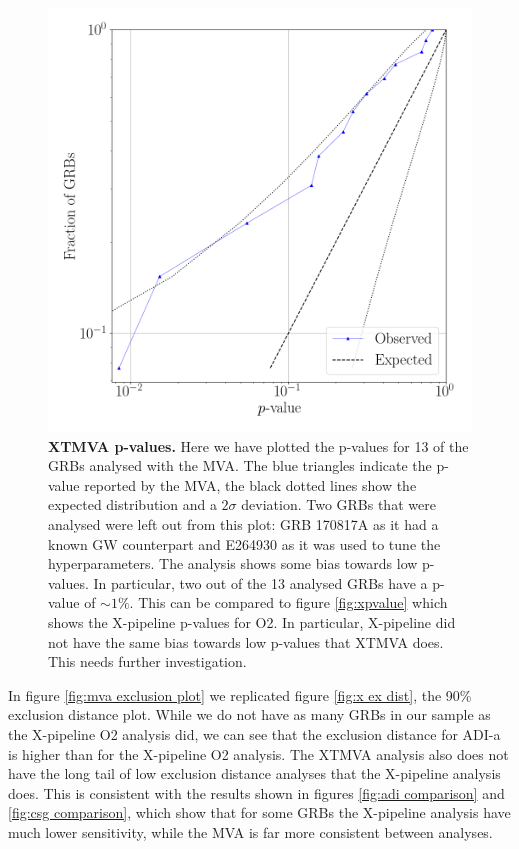 \documentclass[11pt]{cuthesis}
\newcommand{\xp}{X-pipeline }
\begin{document}
\begin{figure} %
\begin{center}
\includegraphics[width=0.8\linewidth]{mva_pvalue.png}
\end{center}
\caption{\textbf{XTMVA p-values.} Here we have plotted the p-values for 13 of the GRBs analysed with the MVA. The blue triangles indicate the p-value reported by the MVA, the black dotted lines show the expected distribution and a $2\sigma$ deviation. Two GRBs that were analysed were left out from this plot: GRB 170817A as it had a known GW counterpart and E264930 as it was used to tune the hyperparameters. The analysis shows some bias towards low p-values. In particular, two out of the 13 analysed GRBs have a p-value of $\sim1\%$. This can be compared to figure \ref{fig:xpvalue} which shows the \xp p-values for O2. In particular, \xp did not have the same bias towards low p-values that XTMVA does. This needs further investigation.}
\label{fig:mva pvalues}
\end{figure}

In figure \ref{fig:mva exclusion plot} we replicated figure \ref{fig:x ex dist}, the 90\% exclusion distance plot. While we do not have as many GRBs in our sample as the \xp O2 analysis did, we can see that the exclusion distance for ADI-a is higher than for the \xp O2 analysis. The XTMVA analysis also does not have the long tail of low exclusion distance analyses that the \xp analysis does. This is consistent with the results shown in figures  \ref{fig:adi comparison} and \ref{fig:csg comparison}, which show that for some GRBs the \xp analysis have much lower sensitivity, while the MVA is far more consistent between analyses. 
\end{document}
